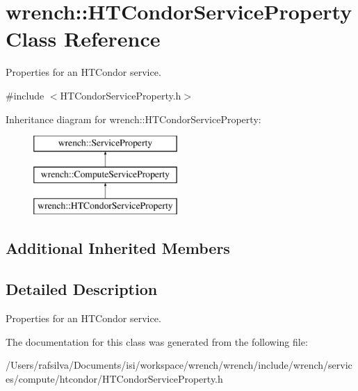 \hypertarget{classwrench_1_1_h_t_condor_service_property}{}\section{wrench\+:\+:H\+T\+Condor\+Service\+Property Class Reference}
\label{classwrench_1_1_h_t_condor_service_property}


Properties for an H\+T\+Condor service.  




{\ttfamily \#include $<$H\+T\+Condor\+Service\+Property.\+h$>$}

Inheritance diagram for wrench\+:\+:H\+T\+Condor\+Service\+Property\+:\begin{figure}[H]
\begin{center}
\leavevmode
\includegraphics[height=3.000000cm]{classwrench_1_1_h_t_condor_service_property}
\end{center}
\end{figure}
\subsection*{Additional Inherited Members}


\subsection{Detailed Description}
Properties for an H\+T\+Condor service. 

The documentation for this class was generated from the following file\+:\begin{DoxyCompactItemize}
\item 
/\+Users/rafsilva/\+Documents/isi/workspace/wrench/wrench/include/wrench/services/compute/htcondor/H\+T\+Condor\+Service\+Property.\+h\end{DoxyCompactItemize}
